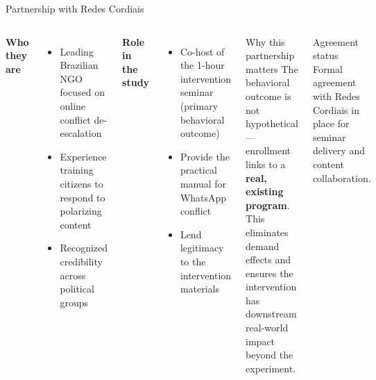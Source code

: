 \documentclass[aspectratio=169]{beamer}
\begin{document}
\begin{frame}{Partnership with Redes Cordiais}
  \begin{columns}[T]
      \textbf{Who they are}
      \begin{itemize}
        \item Leading Brazilian NGO focused on online conflict de-escalation
        \item Experience training citizens to respond to polarizing content
        \item Recognized credibility across political groups
      \end{itemize}
      \vspace{0.5em}
      \textbf{Role in the study}
      \begin{itemize}
        \item Co-host of the 1-hour intervention seminar (primary behavioral outcome)
        \item Provide the practical manual for WhatsApp conflict
        \item Lend legitimacy to the intervention materials
      \end{itemize}
      \begin{block}{Why this partnership matters}
        \vspace{0.3em}
        The behavioral outcome is not hypothetical — enrollment links to a \textbf{real, existing program}. This eliminates demand effects and ensures the intervention has downstream real-world impact beyond the experiment.
      \end{block}
      \vspace{0.4em}
      \begin{alertblock}{Agreement status}
        \vspace{0.2em}
        Formal agreement with Redes Cordiais in place for seminar delivery and content collaboration.
      \end{alertblock}
  \end{columns}
\end{frame}
\end{document}
